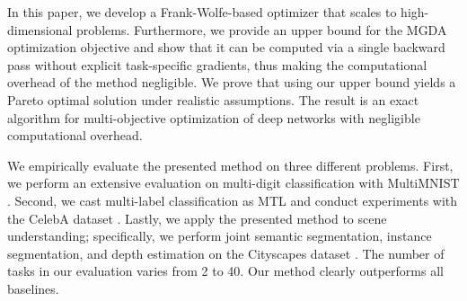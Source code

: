In this paper, we develop a Frank-Wolfe-based optimizer that scales to high-dimensional problems. Furthermore, we provide an upper bound for the MGDA optimization objective and show that it can be computed via a single backward pass without explicit task-specific gradients, thus making the computational overhead of the method negligible. We prove that using our upper bound yields a Pareto optimal solution under realistic assumptions. The result is an exact algorithm for multi-objective optimization of deep networks with negligible computational overhead.

We empirically evaluate the presented method on three different problems. First, we perform an extensive evaluation on multi-digit classification with MultiMNIST \citep{multi_mnist}. Second, we cast multi-label classification as MTL and conduct experiments with the CelebA dataset \citep{celeba}. Lastly, we apply the presented method to scene understanding; specifically, we perform joint semantic segmentation, instance segmentation, and depth estimation on the Cityscapes dataset \citep{cityscapes}. The number of tasks in our evaluation varies from 2 to 40. Our method clearly outperforms all baselines.
